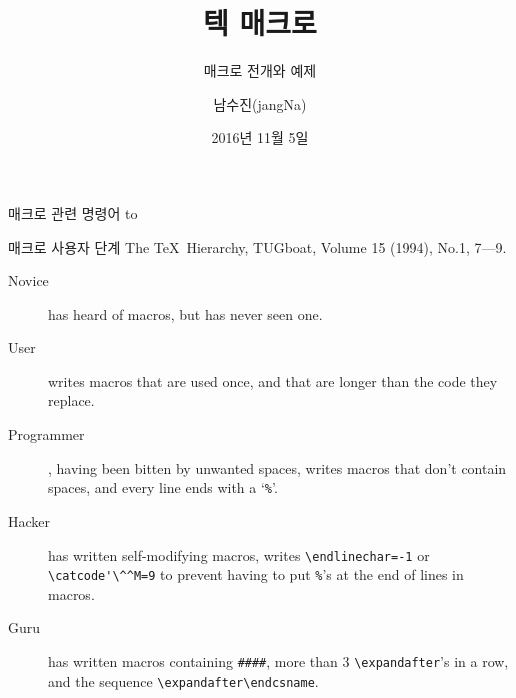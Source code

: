 \documentclass{beamer}
\title{텍 매크로}
\subtitle{매크로 전개와 예제}
\author{남수진(jangNa)}
\date{2016년 11월 5일}
\institute{
  2016 공주대학교 문서작성 워크숍 2016\\
  공주대학교 인문사회과학관 1층 컴퓨터실 107호}
\begin{document}
\maketitle


%
\begin{frame}{매크로 관련 명령어}
  \vspace{4mm}
  \hbox to
\end{frame}


%
\begin{frame}[fragile]{매크로 사용자 단계}
  The \TeX\ Hierarchy, TUGboat, Volume 15 (1994), No.1, 7---9.
  \begin{description}
  \item [Novice] has heard of macros, but has never seen one.
  \item [User] writes macros that are used once, and that are
    longer than the code they replace.
  \item [Programmer], having been bitten by unwanted spaces,
    writes macros that don't contain spaces, and every line ends with
    a `{\small\verb+%+}'.
  \item [Hacker] has written self-modifying macros, writes
    {\small\verb+\endlinechar=-1+} or {\small\verb+\catcode'\^^M=9+}
    to prevent having to put {\small\verb+%+}'s at the end of lines in macros.
  \item [Guru] has written macros containing {\small\verb+####+}, more than 3
    {\small\verb+\expandafter+}'s in a row, and the sequence
    {\small\verb+\expandafter\endcsname+}.
  \end{description}
\end{frame}
\end{document}
